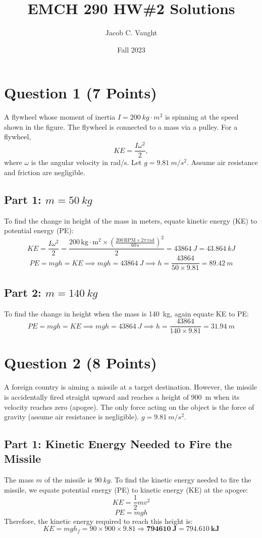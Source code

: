 \documentclass{article}
\title{EMCH 290 HW\#2 Solutions}
\date{Fall 2023}
\author{Jacob C. Vaught}
\begin{document}
\maketitle

\newpage
\section*{Question 1 (7 Points)}
A flywheel whose moment of inertia \( I = \SI{200}{kg \cdot m^2} \) is spinning at the speed shown in the figure. The flywheel is connected to a mass via a pulley. For a flywheel, 
\[
KE = \frac{I \omega^2}{2},
\]
where \( \omega \) is the angular velocity in \si{rad/s}. Let \( g = \SI{9.81}{m/s^2} \). Assume air resistance and friction are negligible.

\subsection*{Part 1: \( m = \SI{50}{kg} \)}
To find the change in height of the mass in meters, equate kinetic energy (KE) to potential energy (PE):
\[
KE = \frac{I \omega^2}{2} = \frac{200 \, \text{kg} \cdot \text{m}^2 \times \left( \frac{200 \, \text{RPM} \times 2\pi \, \text{rad}}{60 \, \text{s}} \right)^2}{2} = \SI{43864}{J} = \SI{43.864}{kJ}
\]
\[
PE = mgh = KE \implies mgh = \SI{43864}{J} \implies h = \frac{43864}{50 \times 9.81} = \SI{89.42}{m}
\]

\subsection*{Part 2: \( m = \SI{140}{kg} \)}
To find the change in height when the mass is \SI{140}{kg}, again equate KE to PE:
\[
PE = mgh = KE \implies mgh = \SI{43864}{J} \implies h = \frac{43864}{140 \times 9.81} = \SI{31.94}{m}
\]



\newpage
\section*{Question 2 (8 Points)}

A foreign country is aiming a missile at a target destination. However, the missile is accidentally fired straight upward and reaches a height of \SI{900}{m} when its velocity reaches zero (apogee). The only force acting on the object is the force of gravity (assume air resistance is negligible). \( g = \SI{9.81}{m/s^2} \).

\subsection*{Part 1: Kinetic Energy Needed to Fire the Missile}
The mass \( m \) of the missile is \( \SI{90}{kg} \). To find the kinetic energy needed to fire the missile, we equate potential energy (PE) to kinetic energy (KE) at the apogee:
\[
KE = \frac{1}{2} m v^2
\]
\[
PE = mgh
\]
Therefore, the kinetic energy required to reach this height is:
\[
KE = mgh_f = 90 \times 900 \times 9.81 \Rightarrow \mathbf{\SI{794610}{J} = \SI{794.610}{kJ}}
\]
\end{document}
